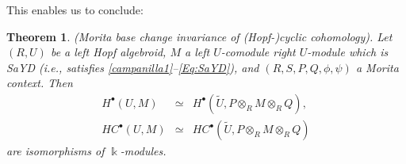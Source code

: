 \documentclass[reqno, a4paper, 10pt]{amsart}
\numberwithin{equation}{section}
\theoremstyle{plain}
\newtheorem{thm}[theorem]{Theorem}
\theoremstyle{definition}
\theoremstyle{remark}
\begin{document}
This enables us to conclude:
\begin{thm}
\label{thm:main2}
{\rm (Morita base change invariance of (Hopf-)cyclic cohomology).}
Let $(R, U)$ be a left Hopf algebroid, $M$ a left $U$-comodule right $U$-module which is SaYD (i.e., satisfies \eqref{campanilla1}--\eqref{Eq:SaYD}), and $(R,S,P,Q,\phi,\psi)$ a Morita context. Then 
\begin{eqnarray*}
H^{{\scriptscriptstyle{\bullet}}}(U, M) &\simeq& H^{{\scriptscriptstyle{\bullet}}}({\tilde{{U}}}, P \otimes_{{\scriptscriptstyle{R}}} M \otimes_{{\scriptscriptstyle{R}}} Q), \\
HC^{{\scriptscriptstyle{\bullet}}}(U, M) &\simeq& HC^{{\scriptscriptstyle{\bullet}}}({\tilde{{U}}}, P \otimes_{{\scriptscriptstyle{R}}} M \otimes_{{\scriptscriptstyle{R}}} Q) 
\end{eqnarray*}
are isomorphisms of $\Bbbk$-modules.
\end{thm}
\end{document}
